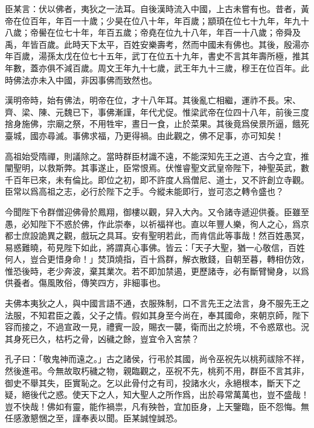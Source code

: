 臣某言：伏以佛者，夷狄之一法耳。自後漢時流入中國，上古未嘗有也。昔者，黃帝在位百年，年百一十歲；少昊在位八十年，年百歲；顓頊在位七十九年，年九十八歲；帝嚳在位七十年，年百五歲；帝堯在位九十八年，年百一十八歲；帝舜及禹，年皆百歲。此時天下太平，百姓安樂壽考，然而中國未有佛也。其後，殷湯亦年百歲，湯孫太戊在位七十五年，武丁在位五十九年，書史不言其年壽所極，推其年數，蓋亦俱不減百歲。周文王年九十七歲，武王年九十三歲，穆王在位百年。此時佛法亦未入中國，非因事佛而致然也。


漢明帝時，始有佛法，明帝在位，才十八年耳。其後亂亡相繼，運祚不長。宋、齊、梁、陳、元魏已下，事佛漸謹，年代尤促。惟梁武帝在位四十八年，前後三度捨身施佛，宗廟之祭，不用牲牢，晝日一食，止於菜果。其後竟爲侯景所逼，餓死臺城，國亦尋滅。事佛求福，乃更得禍。由此觀之，佛不足事，亦可知矣！


高祖始受隋禪，則議除之。當時群臣材識不遠，不能深知先王之道、古今之宜，推闡聖明，以救斯弊。其事遂止，臣常恨焉。伏惟睿聖文武皇帝陛下，神聖英武，數千百年已來，未有倫比。即位之初，即不許度人爲僧尼、道士，又不許創立寺觀。臣常以爲高祖之志，必行於陛下之手。今縱未能即行，豈可恣之轉令盛也？


今聞陛下令群僧迎佛骨於鳳翔，御樓以觀，舁入大內。又令諸寺遞迎供養。臣雖至愚，必知陛下不惑於佛，作此崇奉，以祈福祥也。直以年豐人樂，徇人之心，爲京都士庶設詭異之觀，戲玩之具耳。安有聖明若此，而肯信此等事哉！然百姓愚冥，易惑難曉，苟見陛下如此，將謂真心事佛。皆云：「天子大聖，猶一心敬信，百姓何人，豈合更惜身命！」焚頂燒指，百十爲群，解衣散錢，自朝至暮，轉相仿效，惟恐後時，老少奔波，棄其業次。若不即加禁遏，更歷諸寺，必有斷臂臠身，以爲供養者。傷風敗俗，傳笑四方，非細事也。


夫佛本夷狄之人，與中國言語不通，衣服殊制，口不言先王之法言，身不服先王之法服，不知君臣之義，父子之情。假如其身至今尚在，奉其國命，來朝京師，陛下容而接之，不過宣政一見，禮賓一設，賜衣一襲，衛而出之於境，不令惑眾也。況其身死已久，枯朽之骨，凶穢之餘，豈宜令入宮禁？


孔子曰：「敬鬼神而遠之。」古之諸侯，行弔於其國，尚令巫祝先以桃茢祓除不祥，然後進弔。今無故取朽穢之物，親臨觀之，巫祝不先，桃茢不用，群臣不言其非，御史不舉其失，臣實恥之。乞以此骨付之有司，投諸水火，永絕根本，斷天下之疑，絕後代之惑。使天下之人，知大聖人之所作爲，出於尋常萬萬也，豈不盛哉！豈不快哉！佛如有靈，能作禍祟，凡有殃咎，宜加臣身，上天鑒臨，臣不怨悔。無任感激懇悃之至，謹奉表以聞。臣某誠惶誠恐。
